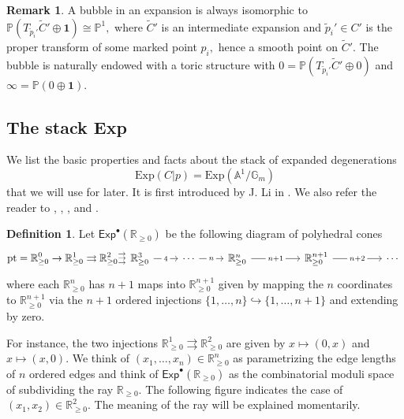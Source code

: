 \documentclass[10.5pt]{amsart}
\theoremstyle{definition}
\theoremstyle{definition}
\theoremstyle{definition}
\theoremstyle{definition}
\newtheorem{remark}[theorem]{Remark}
\newtheorem{definition}[theorem]{Definition}
\begin{document}
\begin{remark}
    A bubble in an expansion is always isomorphic to $\mathbb{P}(T_{\tilde{p}_i'}\tilde{C}'\oplus \mathbf{1})\cong \mathbb{P}^1,$ where $\tilde{C}'$ is an intermediate expansion and $\tilde{p}_i'\in C'$ is the proper transform of some marked point $p_i,$ hence a smooth point on $\tilde{C}'.$ The bubble is naturally endowed with a toric structure with $0 = \mathbb{P}(T_{\tilde{p}_i'}\tilde{C}'\oplus 0)$ and $\infty = \mathbb{P}(0\oplus \mathbf{1}).$\end{remark}

\subsection{The stack Exp}\label{subsec:stackexp}

We list the basic properties and facts about the stack of expanded degenerations $$\mathrm{Exp}(C|p) = \mathrm{Exp}(\mathbb{A}^1/\mathbb{G}_m)$$ that we will use for later. It is first introduced by J. Li in \cite[§1]{Li2001}. We also refer the reader to \cite[§2.5]{GraberVakil}, \cite[§2-3]{ACFW}, \cite[§1]{MT16}, and \cite[§3.3]{Oesinghaus18}.


\begin{definition}
    Let $\mathsf{Exp}^\bullet(\mathbb{R}_{\geq 0})$ be the following diagram of polyhedral cones $$\mathrm{pt} = \mathbb{R}_{\geq 0}^0\to\mathbb{R}_{\geq 0}^1 \rightrightarrows  \mathbb{R}_{\geq 0}^2 \substack{\rightarrow\\[-1em] \rightarrow \\[-1em] \rightarrow} \begin{tikzcd}{\mathbb{R}_{\geq 0}^3} & {\cdots} & {\mathbb{R}_{\geq 0}^{n}} & & {\mathbb{R}_{\geq 0}^{n+1}} & &\cdots
	\arrow["4"{description}, from=1-1, to=1-2]
    \arrow["n"{description}, from=1-2, to=1-3]
    \arrow["n+1"{description}, from=1-3, to=1-5]
    \arrow["n+2"{description}, from=1-5, to=1-7]
\end{tikzcd}$$ where each $\mathbb{R}_{\geq 0}^n$ has $n+1$ maps into $\mathbb{R}_{\geq 0}^{n+1}$ given by mapping the $n$ coordinates to $\mathbb{R}_{\geq 0}^{n+1}$ via the $n+1$ ordered injections $\{1,\dots, n\}\hookrightarrow \{1,\dots, n+1\}$ and extending by zero.
\end{definition} 


For instance, the two injections $\mathbb{R}_{\geq 0}^1\rightrightarrows \mathbb{R}_{\geq 0}^2$ are given by $x\mapsto (0,x)$ and $x\mapsto (x,0).$ We think of $(x_1,\dots, x_n)\in \mathbb{R}_{\geq 0}^n$ as parametrizing the edge lengths of $n$ ordered edges and think of $\mathsf{Exp}^\bullet(\mathbb{R}_{\geq 0})$ as the combinatorial moduli space of subdividing the ray $\mathbb{R}_{\geq 0}.$ The following figure indicates the case of $(x_1,x_2)\in \mathbb{R}_{\geq 0}^2.$ The meaning of the ray will be explained momentarily.
\end{document}
